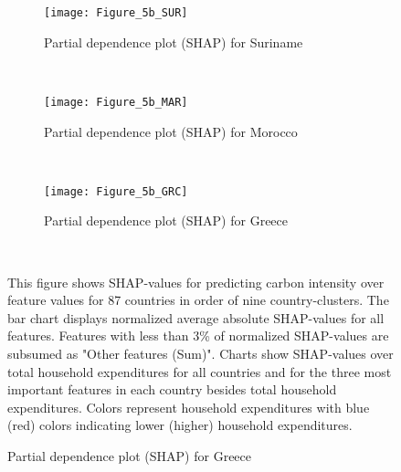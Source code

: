 \begin{figure}[ht!]\ContinuedFloat
    \centering
   \begin{subfigure}[b]{\textwidth}
         \centering
         \caption{Partial dependence plot (SHAP) for Suriname}
         \label{fig:5b_SUR}
         \texttt{[image: Figure\_5b\_SUR]}         
     \end{subfigure}
    \\
    \vspace{0.5cm}
   \begin{subfigure}[b]{\textwidth}
         \centering
         \caption{Partial dependence plot (SHAP) for Morocco}
         \label{fig:5b_MAR}
         \texttt{[image: Figure\_5b\_MAR]}         
     \end{subfigure}
    \\
    \vspace{0.5cm}
   \begin{subfigure}[b]{\textwidth}
         \centering
         \caption{Partial dependence plot (SHAP) for Greece}
         \label{fig:5b_GRC}
         \texttt{[image: Figure\_5b\_GRC]}
    \end{subfigure}
    \\
    \vspace{0.5cm}
    \begin{subcaption2}
     This figure shows SHAP-values for predicting carbon intensity over feature values for 87 countries in order of nine country-clusters. The bar chart displays normalized average absolute SHAP-values for all features. Features with less than 3\% of normalized SHAP-values are subsumed as "Other features (Sum)". Charts show SHAP-values over total household expenditures for all countries and for the three most important features in each country besides total household expenditures. Colors represent household expenditures with blue (red) colors indicating lower (higher) household expenditures.
     \end{subcaption2}
\end{figure}

